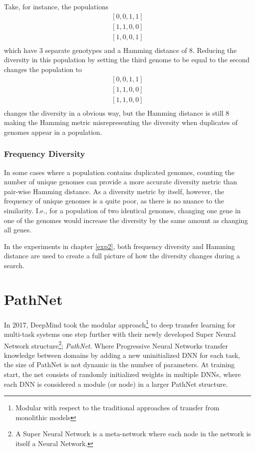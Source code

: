 Take, for instance, the populations 
\begin{equation*}
    \begin{split}
        [0, 0, 1, 1]\\
        [1, 1, 0, 0]\\
        [1, 0, 0, 1]\\
    \end{split}
\end{equation*}
which have 3 separate genotypes and a Hamming distance of 8. Reducing the diversity in this population by setting the third genome to be equal to the second changes the population to 
\begin{equation*}
    \begin{split}
        [0, 0, 1, 1]\\
        [1, 1, 0, 0]\\
        [1, 1, 0, 0]\\
    \end{split}
\end{equation*}
changes the diversity in a obvious way, but the Hamming distance is still 8 making the Hamming metric misrepresenting the diversity when duplicates of genomes appear in a population. 

\subsubsection{Frequency Diversity}
In some cases where a population contains duplicated genomes, counting the number of unique genomes can provide a more accurate diversity metric than pair-wise Hamming distance. As a diversity metric by itself, however, the frequency of unique genomes is a quite poor, as there is no nuance to the similarity. I.e., for a population of two identical genomes, changing one gene in one of the genomes would increase the diversity by the same amount as changing all genes. 

In the experiments in chapter \ref{exp2}, both frequency diversity and Hamming distance are used to create a full picture of how the diversity changes during a search.

\section{PathNet}
\label{background:pn}
In 2017, DeepMind took the modular approach\footnote{Modular with respect to the traditional approaches of transfer from monolithic models} to deep transfer learning for multi-task systems one step further with their newly developed Super Neural Network structure\footnote{A Super Neural Network is a meta-network where each node in the network is itself a Neural Network.}; \textit{PathNet}\cite{pathnet}. Where Progressive Neural Networks transfer knowledge between domains by adding a new uninitialized DNN for each task, the size of PathNet is not dynamic in the number of parameters. At training start, the net consists of randomly initialized weights in multiple DNNs, where each DNN is considered a module (or node) in a larger PathNet structure. 

